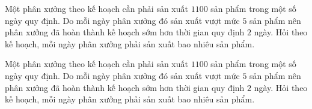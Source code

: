 \begin{bt}%
Một phân xưởng theo kế hoạch cần phải sản xuất $1100$ sản phẩm trong một số ngày quy định. Do mỗi ngày phân xưởng đó sản xuất vượt mức $5$ sản phẩm nên phân xưởng đã hoàn thành kế hoạch sớm hơn thời gian quy định $2$ ngày. Hỏi theo kế hoạch, mỗi ngày phân xưởng phải sản xuất bao nhiêu sản phẩm.
\end{bt}

\begin{bt}%
Một phân xưởng theo kế hoạch cần phải sản xuất $1100$ sản phẩm trong một số ngày quy định. Do mỗi ngày phân xưởng đó sản xuất vượt mức $5$ sản phẩm nên phân xưởng đã hoàn thành kế hoạch sớm hơn thời gian quy định $2$ ngày. Hỏi theo kế hoạch, mỗi ngày phân xưởng phải sản xuất bao nhiêu sản phẩm.
\end{bt}


